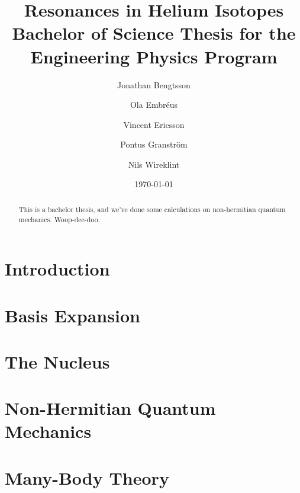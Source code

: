 \documentclass[12pt,a4paper]{report}
\begin{document}
  

\listoftodos

\title{Resonances in Helium Isotopes\\ 
\large Bachelor of Science Thesis for the Engineering Physics Program}
\author{Jonathan Bengtsson  \and Ola Embréus \and Vincent Ericsson \and Pontus Granström \and Nils Wireklint}
\date{\today}



\maketitle

\newpage
\begin{abstract}
This is a bachelor thesis, and we've done some calculations on non-hermitian quantum mechanics. Woop-dee-doo.
\end{abstract}
\newpage

\tableofcontents


\newpage

\setcounter{page}{1}

\chapter{Introduction}
\label{cha:introduction}



\chapter{Basis Expansion}
\label{cha:basis expansion}


\chapter{The  Nucleus}
\label{cha:he5}


\chapter{Non-Hermitian Quantum Mechanics} 
\label{cha:nhqm}



\chapter{Many-Body Theory}
\label{cha:many-body}


\end{document}
